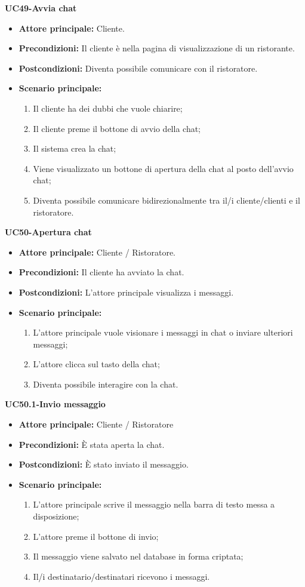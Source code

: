 
\textbf{UC49-Avvia chat}
\begin{itemize}
\item \textbf{Attore principale:} Cliente.
\item \textbf{Precondizioni:} Il cliente è nella pagina di visualizzazione di un ristorante.
\item \textbf{Postcondizioni:} Diventa possibile comunicare con il ristoratore.
\item \textbf{Scenario principale:}
\begin{enumerate}
    \item Il cliente ha dei dubbi che vuole chiarire;
    \item Il cliente preme il bottone di avvio della chat;
    \item Il sistema crea la chat;
    \item Viene visualizzato un bottone di apertura della chat al posto dell'avvio chat;
    \item Diventa possibile comunicare bidirezionalmente tra il/i cliente/clienti e il ristoratore.
\end{enumerate}
\end{itemize}

\textbf{UC50-Apertura chat}
\begin{itemize}
\item \textbf{Attore principale:} Cliente / Ristoratore.
\item \textbf{Precondizioni:} Il cliente ha avviato la chat.
\item \textbf{Postcondizioni:} L'attore principale visualizza i messaggi.
\item \textbf{Scenario principale:}
\begin{enumerate}
    \item L'attore principale vuole visionare i messaggi in chat o inviare ulteriori messaggi;
    \item L'attore clicca sul tasto della chat;
    \item Diventa possibile interagire con la chat.
\end{enumerate}
\end{itemize}

\textbf{UC50.1-Invio messaggio}
\begin{itemize}
\item \textbf{Attore principale:} Cliente / Ristoratore
\item \textbf{Precondizioni:} È stata aperta la chat.
\item \textbf{Postcondizioni:} È stato inviato il messaggio.
\item \textbf{Scenario principale:}
\begin{enumerate}
    \item L'attore principale scrive il messaggio nella barra di testo messa a disposizione;
    \item L'attore preme il bottone di invio;
    \item Il messaggio viene salvato nel database in forma criptata;
    \item Il/i destinatario/destinatari ricevono i messaggi.
\end{enumerate}
\end{itemize}

